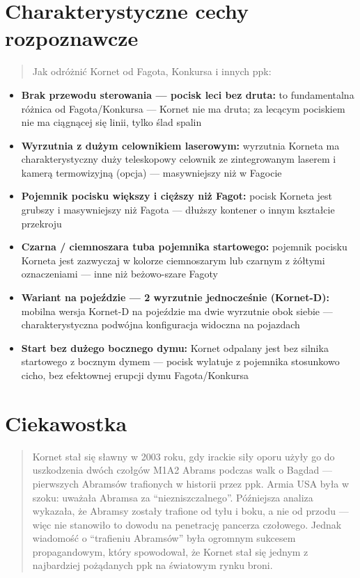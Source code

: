 \documentclass[12pt,openany,oneside]{book}
\providecommand{\tightlist}{%
  \setlength{\itemsep}{0pt}\setlength{\parskip}{0pt}}
\begin{document}
\section{Charakterystyczne cechy
rozpoznawcze}\label{charakterystyczne-cechy-rozpoznawcze-38}

\begin{quote}
Jak odróżnić Kornet od Fagota, Konkursa i innych ppk:
\end{quote}

\begin{itemize}
\tightlist
\item
  \textbf{Brak przewodu sterowania --- pocisk leci bez druta:} to
  fundamentalna różnica od Fagota/Konkursa --- Kornet nie ma druta; za
  lecącym pociskiem nie ma ciągnącej się linii, tylko ślad spalin
\item
  \textbf{Wyrzutnia z dużym celownikiem laserowym:} wyrzutnia Korneta ma
  charakterystyczny duży teleskopowy celownik ze zintegrowanym laserem i
  kamerą termowizyjną (opcja) --- masywniejszy niż w Fagocie
\item
  \textbf{Pojemnik pocisku większy i cięższy niż Fagot:} pocisk Korneta
  jest grubszy i masywniejszy niż Fagota --- dłuższy kontener o innym
  kształcie przekroju
\item
  \textbf{Czarna / ciemnoszara tuba pojemnika startowego:} pojemnik
  pocisku Korneta jest zazwyczaj w kolorze ciemnoszarym lub czarnym z
  żółtymi oznaczeniami --- inne niż beżowo-szare Fagoty
\item
  \textbf{Wariant na pojeździe --- 2 wyrzutnie jednocześnie (Kornet-D):}
  mobilna wersja Kornet-D na pojeździe ma dwie wyrzutnie obok siebie ---
  charakterystyczna podwójna konfiguracja widoczna na pojazdach
\item
  \textbf{Start bez dużego bocznego dymu:} Kornet odpalany jest bez
  silnika startowego z bocznym dymem --- pocisk wylatuje z pojemnika
  stosunkowo cicho, bez efektownej erupcji dymu Fagota/Konkursa
\end{itemize}

\section{Ciekawostka}\label{ciekawostka-38}

\begin{quote}
Kornet stał się sławny w 2003 roku, gdy irackie siły oporu użyły go do
uszkodzenia dwóch czołgów M1A2 Abrams podczas walk o Bagdad ---
pierwszych Abramsów trafionych w historii przez ppk. Armia USA była w
szoku: uważała Abramsa za ``niezniszczalnego''. Późniejsza analiza
wykazała, że Abramsy zostały trafione od tyłu i boku, a nie od przodu
--- więc nie stanowiło to dowodu na penetrację pancerza czołowego.
Jednak wiadomość o ``trafieniu Abramsów'' była ogromnym sukcesem
propagandowym, który spowodował, że Kornet stał się jednym z najbardziej
pożądanych ppk na światowym rynku broni.
\end{quote}
\end{document}
